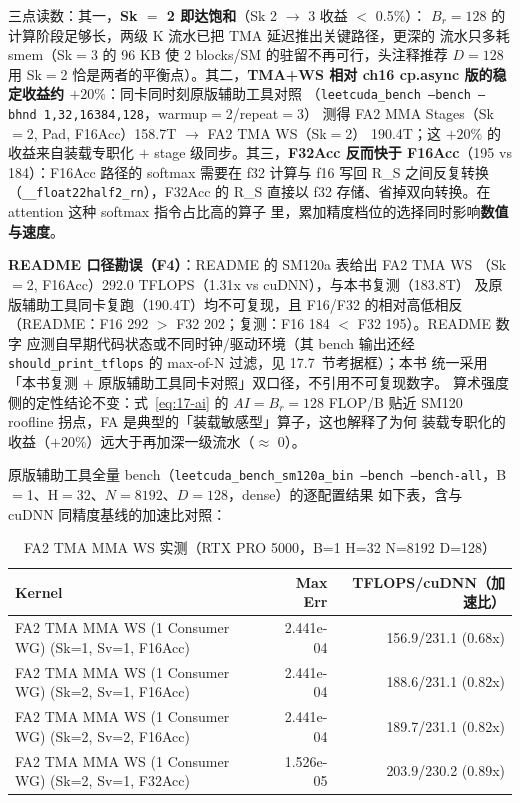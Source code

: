 三点读数：其一，\textbf{Sk $=$ 2 即达饱和}（Sk 2 $\to$ 3 收益 $<$ 0.5\%）：
$B_r{=}128$ 的计算阶段足够长，两级 K 流水已把 TMA 延迟推出关键路径，更深的
流水只多耗 smem（Sk$=$3 的 96 KB 使 2 blocks/SM 的驻留不再可行，头注释推荐
$D{=}128$ 用 Sk$=$2 恰是两者的平衡点）。其二，\textbf{TMA+WS 相对
ch16 cp.async 版的稳定收益约 $+20\%$}：同卡同时刻原版辅助工具对照
（\texttt{leetcuda\_\allowbreak{}bench --bench --bhnd 1,\allowbreak{}32,\allowbreak{}16384,\allowbreak{}128}，warmup$=$2/repeat$=$3）
测得 FA2 MMA Stages（Sk$=$2, Pad, F16Acc）158.7T $\to$ FA2 TMA WS（Sk$=$2）
190.4T；这 $+20\%$ 的收益来自装载专职化 $+$ stage 级同步。其三，\textbf{F32Acc
反而快于 F16Acc}（195 vs 184）：F16Acc 路径的 softmax 需要在 f32 计算与
f16 写回 R\_S 之间反复转换（\texttt{\_\allowbreak{}\_\allowbreak{}float22half2\_\allowbreak{}rn}），F32Acc 的 R\_S
直接以 f32 存储、省掉双向转换。在 attention 这种 softmax 指令占比高的算子
里，累加精度档位的选择同时影响\textbf{数值与速度}。

\textbf{README 口径勘误（F4）}：README 的 SM120a 表给出 FA2 TMA WS
（Sk$=$2, F16Acc）292.0 TFLOPS（1.31x vs cuDNN），与本书复测（183.8T）
及原版辅助工具同卡复跑（190.4T）均不可复现，且 F16/F32 的相对高低相反
（README：F16 292 $>$ F32 202；复测：F16 184 $<$ F32 195）。README 数字
应测自早期代码状态或不同时钟/驱动环境（其 bench 输出还经
\texttt{should\_\allowbreak{}print\_\allowbreak{}tflops} 的 max-of-N 过滤，见 17.7~节考据框）；本书
统一采用「本书复测 $+$ 原版辅助工具同卡对照」双口径，不引用不可复现数字。
算术强度侧的定性结论不变：式~\ref{eq:17-ai} 的 $AI = B_r = 128$ FLOP/B
贴近 SM120 roofline 拐点，FA 是典型的「装载敏感型」算子，这也解释了为何
装载专职化的收益（$+20\%$）远大于再加深一级流水（$\approx$ 0）。

原版辅助工具全量 bench（\texttt{leetcuda\_\allowbreak{}bench\_\allowbreak{}sm120a\_\allowbreak{}bin --bench
--bench-all}，B$=$1、H$=$32、$N{=}8192$、$D{=}128$，dense）的逐配置结果
如下表，含与 cuDNN 同精度基线的加速比对照：

\begin{table}[H]
\centering
\caption{FA2 TMA MMA WS 实测（RTX PRO 5000，B=1 H=32 N=8192 D=128）}
\label{tab:ch17-perf}
\small
\setlength{\tabcolsep}{4pt}
\begin{tabular}{lrr}
\toprule
Kernel & Max Err & TFLOPS/cuDNN（加速比） \\
\midrule
{\footnotesize FA2 TMA MMA WS (1 Consumer WG) (Sk=1, Sv=1, F16Acc)} & 2.441e-04 & 156.9/231.1 (0.68x) \\
{\footnotesize FA2 TMA MMA WS (1 Consumer WG) (Sk=2, Sv=1, F16Acc)} & 2.441e-04 & 188.6/231.1 (0.82x) \\
{\footnotesize FA2 TMA MMA WS (1 Consumer WG) (Sk=2, Sv=2, F16Acc)} & 2.441e-04 & 189.7/231.1 (0.82x) \\
{\footnotesize FA2 TMA MMA WS (1 Consumer WG) (Sk=2, Sv=1, F32Acc)} & 1.526e-05 & 203.9/230.2 (0.89x) \\
\bottomrule
\end{tabular}
\end{table}

